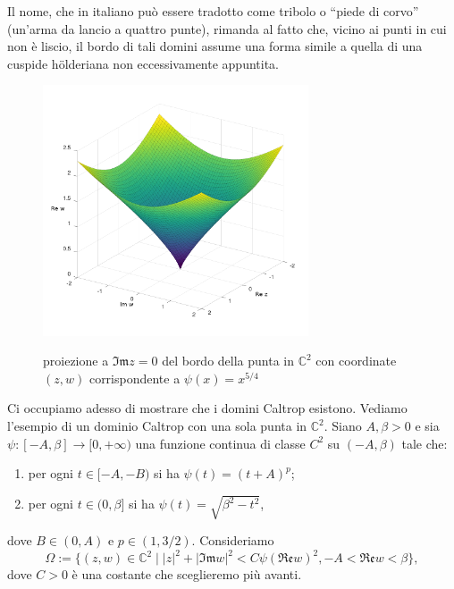\begin{oss}
    Il nome, che in italiano può essere tradotto come tribolo o ``piede di corvo'' (un'arma da lancio a quattro punte), rimanda al fatto che, vicino ai punti in cui non è liscio, il bordo di tali domini assume una forma simile a quella di una cuspide hölderiana non eccessivamente appuntita.
\end{oss}

\begin{figure}[h!]
    \begin{center}
        \includegraphics[width=0.7\textwidth, trim=0 4cm 0 2.5cm]{Immagini/caltrop.png} \\
        \caption{proiezione a $\mathfrak{Im}z=0$ del bordo della punta in $\mathbb{C}^2$ con coordinate $(z,w)$ corrispondente a $\psi(x)=x^{5/4}$}
    \end{center}
\end{figure}

Ci occupiamo adesso di mostrare che i domini Caltrop esistono. Vediamo l'esempio di un dominio Caltrop con una sola punta in $\mathbb{C}^2$. Siano $A,\beta>0$ e sia $\psi:[-A,\beta]\longrightarrow[0,+\infty)$ una funzione continua di classe $C^2$ su $(-A,\beta)$ tale che:
\begin{enumerate}[label={(\arabic*)}]
    \item per ogni $t\in[-A,-B)$ si ha $\psi(t)=(t+A)^p$;
    \item per ogni $t\in(0,\beta]$ si ha $\psi(t)=\sqrt{\beta^2-t^2}$,
\end{enumerate}
dove $B\in(0,A)$ e $p\in(1,3/2)$. Consideriamo
$$\Omega:=\{(z,w)\in\mathbb{C}^2\mid |z|^2+|\mathfrak{Im}w|^2<C\psi(\mathfrak{Re}w)^2,-A<\mathfrak{Re}w<\beta\},$$
dove $C>0$ è una costante che sceglieremo più avanti.

